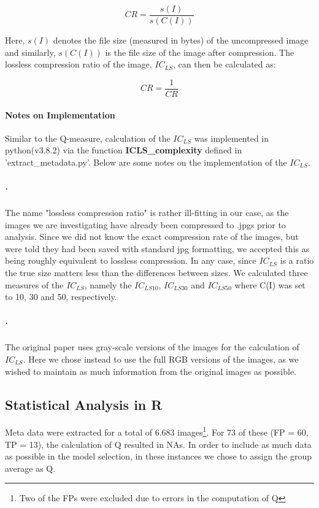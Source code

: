 \documentclass[12pt]{article}
\begin{document}
\begin{equation}
	CR = \frac{s(I)}{s(C(I))}
	\label{eq:CR1}
\end{equation} 

Here, $s(I)$ denotes the file size (measured in bytes) of the uncompressed image and similarly, $s(C(I))$ is the file size of the image after compression. The lossless compression ratio of the image, $IC_{LS}$, can then be calculated as:

\begin{equation}
	CR = \frac{1}{CR}
	\label{eq:CR2}
\end{equation} 

\paragraph{Notes on Implementation}
Similar to the Q-measure, calculation of the $IC_{LS}$ was implemented in python(v3.8.2) via the function \textbf{ICLS\_complexity} defined in 'extract\_metadata.py'. Below are some notes on the implementation of the $IC_{LS}$.
\subparagraph{.}
The name "lossless compression ratio" is rather ill-fitting in our case, as the images we are investigating have already been compressed to .jpgs prior to analysis. Since we did not know the exact compression rate of the images, but were told they had been saved with standard jpg formatting, we accepted this as being roughly equivalent to lossless compression. In any case, since $IC_{LS}$ is a ratio the true size matters less than the differences between sizes. We calculated three measures of the $IC_{LS}$, namely the $IC_{LS10}$, $IC_{LS30}$ and $IC_{LS50}$ where C(I) was set to 10, 30 and 50, respectively.

\subparagraph{.}
The original paper uses gray-scale versions of the images for the calculation of $IC_{LS}$. Here we chose instead to use the full RGB versions of the images, as we wished to maintain as much information from the original images as possible.

\subsection{Statistical Analysis in R}\label{R}
Meta data were extracted for a total of 6.683 images\footnote{Two of the FPs were excluded due to errors in the computation of Q}. For 73 of these (FP = 60, TP = 13), the calculation of Q resulted in NAs. In order to include as much data as possible in the model selection, in these instances we chose to assign the group average as Q.
\end{document}
